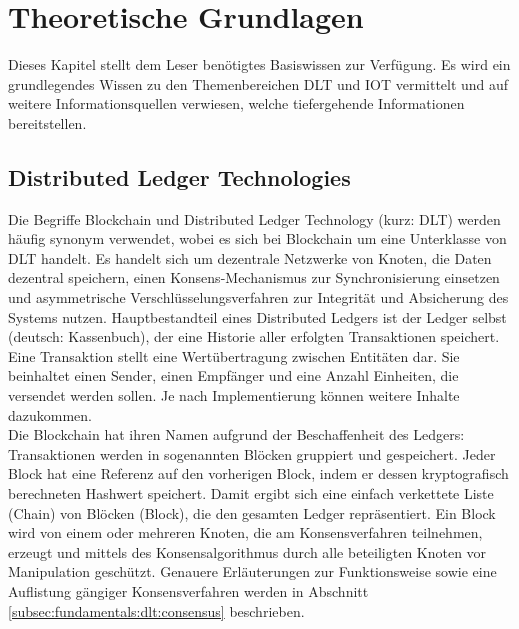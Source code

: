 \chapter{Theoretische Grundlagen}
\label{ch:fundamentals}
Dieses Kapitel stellt dem Leser benötigtes Basiswissen zur Verfügung. Es wird ein grundlegendes Wissen zu den Themenbereichen \ac{DLT} und \ac{IOT} vermittelt und auf weitere Informationsquellen verwiesen, welche tiefergehende Informationen bereitstellen.

%
%
\section{Distributed Ledger Technologies}
\label{sec:fundamentals:dlt}
Die Begriffe Blockchain und Distributed Ledger Technology (kurz: \ac{DLT}) werden häufig synonym verwendet, wobei es sich bei Blockchain um eine Unterklasse von \ac{DLT} handelt. Es handelt sich um dezentrale Netzwerke von Knoten, die Daten dezentral speichern, einen Konsens-Mechanismus zur Synchronisierung einsetzen und asymmetrische Verschlüsselungsverfahren zur Integrität und Absicherung des Systems nutzen. Hauptbestandteil eines Distributed Ledgers ist der Ledger selbst (deutsch: Kassenbuch), der eine Historie aller erfolgten Transaktionen speichert. Eine Transaktion stellt eine Wertübertragung zwischen Entitäten dar. Sie beinhaltet einen Sender, einen Empfänger und eine Anzahl Einheiten, die versendet werden sollen. Je nach Implementierung können weitere Inhalte dazukommen.\\
Die Blockchain hat ihren Namen aufgrund der Beschaffenheit des Ledgers: Transaktionen werden in sogenannten Blöcken gruppiert und gespeichert. Jeder Block hat eine Referenz auf den vorherigen Block, indem er dessen kryptografisch berechneten Hashwert speichert. Damit ergibt sich eine einfach verkettete Liste (Chain) von Blöcken (Block), die den gesamten Ledger repräsentiert. Ein Block wird von einem oder mehreren Knoten, die am Konsensverfahren teilnehmen, erzeugt und mittels des Konsensalgorithmus durch alle beteiligten Knoten vor Manipulation geschützt. Genauere Erläuterungen zur Funktionsweise sowie eine Auflistung gängiger Konsensverfahren werden in Abschnitt \ref{subsec:fundamentals:dlt:consensus} beschrieben.\\

